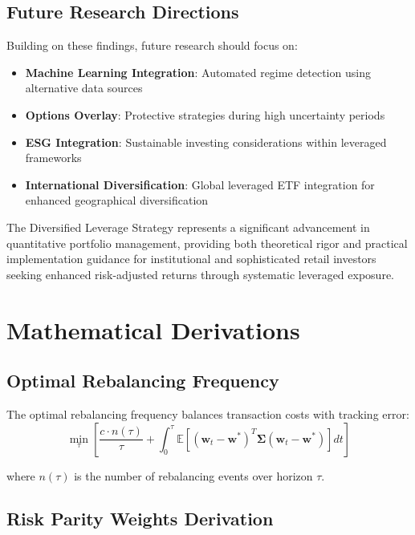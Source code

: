 \documentclass[onecolumn,11pt]{IEEEtran}
\begin{document}
\subsection{Future Research Directions}

Building on these findings, future research should focus on:
\begin{itemize}
    \item \textbf{Machine Learning Integration}: Automated regime detection using alternative data sources
    \item \textbf{Options Overlay}: Protective strategies during high uncertainty periods
    \item \textbf{ESG Integration}: Sustainable investing considerations within leveraged frameworks
    \item \textbf{International Diversification}: Global leveraged ETF integration for enhanced geographical diversification
\end{itemize}

The Diversified Leverage Strategy represents a significant advancement in quantitative portfolio management, providing both theoretical rigor and practical implementation guidance for institutional and sophisticated retail investors seeking enhanced risk-adjusted returns through systematic leveraged exposure.

\appendix

\section{Mathematical Derivations}

\subsection{Optimal Rebalancing Frequency}

The optimal rebalancing frequency balances transaction costs with tracking error:
\begin{equation}
\min_\tau \left[ \frac{c \cdot n(\tau)}{\tau} + \int_0^\tau \mathbb{E}[(\mathbf{w}_t - \mathbf{w}^*)^T \boldsymbol{\Sigma} (\mathbf{w}_t - \mathbf{w}^*)] dt \right]
\end{equation}

where $n(\tau)$ is the number of rebalancing events over horizon $\tau$.

\subsection{Risk Parity Weights Derivation}
\end{document}
